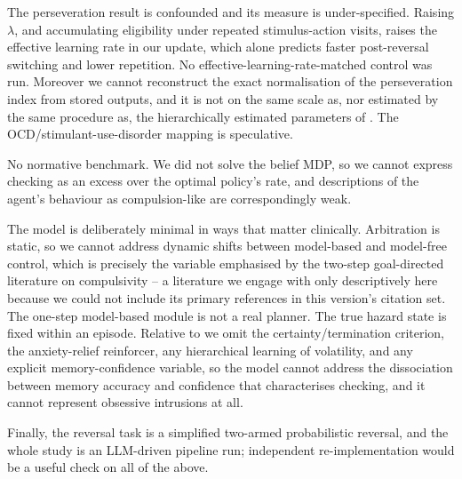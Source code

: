 \documentclass[11pt,a4paper]{article}
\begin{document}
The perseveration result is confounded and its measure is under-specified. Raising $\lambda$, and accumulating eligibility under repeated stimulus-action visits, raises the effective learning rate in our update, which alone predicts faster post-reversal switching and lower repetition. No effective-learning-rate-matched control was run. Moreover we cannot reconstruct the exact normalisation of the perseveration index from stored outputs, and it is not on the same scale as, nor estimated by the same procedure as, the hierarchically estimated parameters of \citet{kanen2019computational}. The OCD/stimulant-use-disorder mapping is speculative.

No normative benchmark. We did not solve the belief MDP, so we cannot express checking as an excess over the optimal policy's rate, and descriptions of the agent's behaviour as compulsion-like are correspondingly weak.

The model is deliberately minimal in ways that matter clinically. Arbitration is static, so we cannot address dynamic shifts between model-based and model-free control, which is precisely the variable emphasised by the two-step goal-directed literature on compulsivity -- a literature we engage with only descriptively here because we could not include its primary references in this version's citation set. The one-step model-based module is not a real planner. The true hazard state is fixed within an episode. Relative to \citet{fradkin2020searching} we omit the certainty/termination criterion, the anxiety-relief reinforcer, any hierarchical learning of volatility, and any explicit memory-confidence variable, so the model cannot address the dissociation between memory accuracy and confidence that characterises checking, and it cannot represent obsessive intrusions at all.

Finally, the reversal task is a simplified two-armed probabilistic reversal, and the whole study is an LLM-driven pipeline run; independent re-implementation would be a useful check on all of the above.
\end{document}

